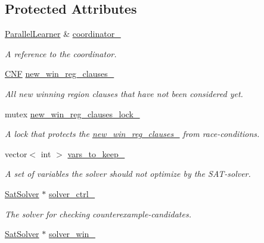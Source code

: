 \subsection*{Protected Attributes}
\begin{DoxyCompactItemize}
\item 
\hyperlink{classParallelLearner}{Parallel\-Learner} \& \hyperlink{classCounterGenSAT_a90c79c0fa427fcd2dacd760421f5afe4}{coordinator\-\_\-}
\begin{DoxyCompactList}\small\item\em A reference to the coordinator. \end{DoxyCompactList}\item 
\hyperlink{classCNF}{C\-N\-F} \hyperlink{classCounterGenSAT_a5a379bda175a32e3d4ccc0771fde024d}{new\-\_\-win\-\_\-reg\-\_\-clauses\-\_\-}
\begin{DoxyCompactList}\small\item\em All new winning region clauses that have not been considered yet. \end{DoxyCompactList}\item 
mutex \hyperlink{classCounterGenSAT_a120e7ea918e720bedb9b35a40e354307}{new\-\_\-win\-\_\-reg\-\_\-clauses\-\_\-lock\-\_\-}
\begin{DoxyCompactList}\small\item\em A lock that protects the \hyperlink{classCounterGenSAT_a5a379bda175a32e3d4ccc0771fde024d}{new\-\_\-win\-\_\-reg\-\_\-clauses\-\_\-} from race-\/conditions. \end{DoxyCompactList}\item 
vector$<$ int $>$ \hyperlink{classCounterGenSAT_a0c568c2e441491d24a5a98623fa6ce6a}{vars\-\_\-to\-\_\-keep\-\_\-}
\begin{DoxyCompactList}\small\item\em A set of variables the solver should not optimize by the S\-A\-T-\/solver. \end{DoxyCompactList}\item 
\hyperlink{classSatSolver}{Sat\-Solver} $\ast$ \hyperlink{classCounterGenSAT_a8ed22d7411e62b13c50824664e58807a}{solver\-\_\-ctrl\-\_\-}
\begin{DoxyCompactList}\small\item\em The solver for checking counterexample-\/candidates. \end{DoxyCompactList}\item 
\hyperlink{classSatSolver}{Sat\-Solver} $\ast$ \hyperlink{classCounterGenSAT_a4c209741406375df9ba19b830ca4d6f9}{solver\-\_\-win\-\_\-}

\end{DoxyCompactItemize}

